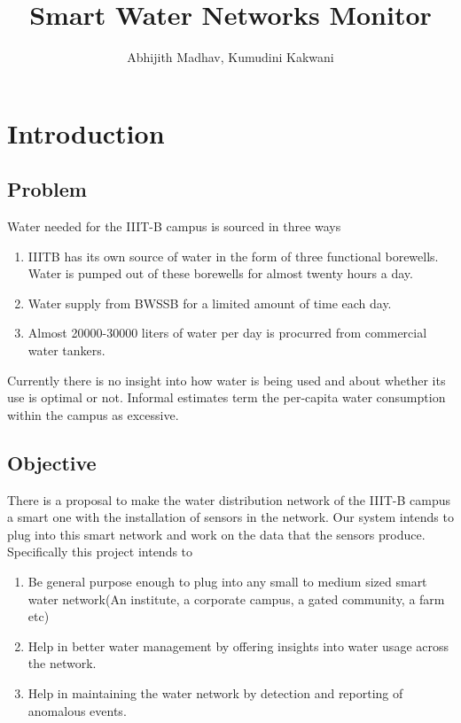 \documentclass[11pt]{report} %
\title{Smart Water Networks Monitor}
\author{Abhijith Madhav, Kumudini Kakwani}
\begin{document}
\maketitle

\tableofcontents

\chapter{Introduction}
\section{Problem}
Water needed for the IIIT-B campus is sourced in three ways
\begin{enumerate}
\item
IIITB has its own source of water in the form of three functional borewells. Water is pumped out of these borewells for almost twenty hours a day. 
\item
Water supply from BWSSB for a limited amount of time each day.
\item
Almost 20000-30000 liters of water per day is procurred from commercial water tankers.
\end{enumerate}
Currently there is no insight into how water is being used and about whether its use is optimal or not. Informal estimates term the per-capita water consumption within the campus as excessive.

\section{Objective}
There is a proposal to make the water distribution network of the IIIT-B campus a smart one with the installation of sensors in the network. Our system intends to plug into this smart network and work on the data that the sensors produce. \\

Specifically this project intends to
\begin{enumerate}
\item
Be general purpose enough to plug into any small to medium sized smart water network(An institute, a corporate campus, a gated community, a farm etc)
\item
Help in better water management by offering insights into water usage across the network.
\item
Help in maintaining the water network by detection and reporting of anomalous events.
\end{enumerate}
\end{document}
